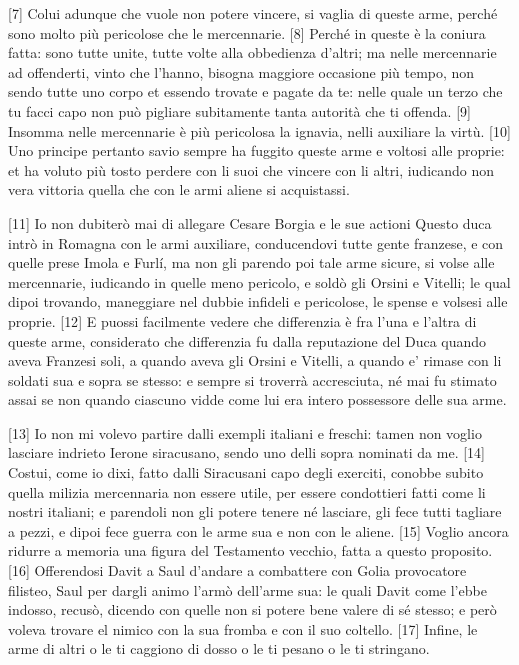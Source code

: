 {[}7{]} Colui adunque che vuole non potere vincere, si vaglia di queste
arme, perché sono molto più pericolose che le mercennarie. {[}8{]}
Perché in queste è la coniura fatta: sono tutte unite, tutte volte alla
obbedienza d'altri; ma nelle mercennarie ad offenderti, vinto che
l'hanno, bisogna maggiore occasione più tempo, non sendo tutte uno corpo
et essendo trovate e pagate da te: nelle quale un terzo che tu facci
capo non può pigliare subitamente tanta autorità che ti offenda. {[}9{]}
Insomma nelle mercennarie è più pericolosa la ignavia, nelli auxiliare
la virtù. {[}10{]} Uno principe pertanto savio sempre ha fuggito queste
arme e voltosi alle proprie: et ha voluto più tosto perdere con li suoi
che vincere con li altri, iudicando non vera vittoria quella che con le
armi aliene si acquistassi.

{[}11{]} Io non dubiterò mai di allegare Cesare Borgia e le sue actioni
Questo duca intrò in Romagna con le armi auxiliare, conducendovi tutte
gente franzese, e con quelle prese Imola e Furlí, ma non gli parendo poi
tale arme sicure, si volse alle mercennarie, iudicando in quelle meno
pericolo, e soldò gli Orsini e Vitelli; le qual dipoi trovando,
maneggiare nel dubbie infideli e pericolose, le spense e volsesi alle
proprie. {[}12{]} E puossi facilmente vedere che differenzia è fra l'una
e l'altra di queste arme, considerato che differenzia fu dalla
reputazione del Duca quando aveva Franzesi soli, a quando aveva gli
Orsini e Vitelli, a quando e' rimase con li soldati sua e sopra se
stesso: e sempre si troverrà accresciuta, né mai fu stimato assai se non
quando ciascuno vidde come lui era intero possessore delle sua arme.

{[}13{]} Io non mi volevo partire dalli exempli italiani e freschi:
tamen non voglio lasciare indrieto Ierone siracusano, sendo uno delli
sopra nominati da me. {[}14{]} Costui, come io dixi, fatto dalli
Siracusani capo degli exerciti, conobbe subito quella milizia
mercennaria non essere utile, per essere condottieri fatti come li
nostri italiani; e parendoli non gli potere tenere né lasciare, gli fece
tutti tagliare a pezzi, e dipoi fece guerra con le arme sua e non con le
aliene. {[}15{]} Voglio ancora ridurre a memoria una figura del
Testamento vecchio, fatta a questo proposito. {[}16{]} Offerendosi Davit
a Saul d'andare a combattere con Golia provocatore filisteo, Saul per
dargli animo l'armò dell'arme sua: le quali Davit come l'ebbe indosso,
recusò, dicendo con quelle non si potere bene valere di sé stesso; e
però voleva trovare el nimico con la sua fromba e con il suo coltello.
{[}17{]} Infine, le arme di altri o le ti caggiono di dosso o le ti
pesano o le ti stringano.

